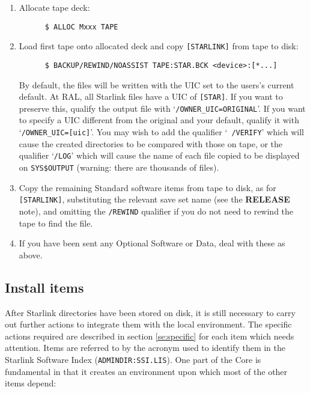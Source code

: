 \begin{enumerate}

\item Allocate tape deck:

\begin{verbatim}
      $ ALLOC Mxxx TAPE
\end{verbatim}

\item Load first tape onto allocated deck and copy {\tt [STARLINK]} from tape
to disk:

\begin{verbatim}
      $ BACKUP/REWIND/NOASSIST TAPE:STAR.BCK <device>:[*...]
\end{verbatim}

By default, the files will be written with the UIC set to the users's current
default. At RAL, all Starlink files have a UIC of {\tt [STAR]}. If you want to
preserve this, qualify the output file with `{\tt /OWNER\_UIC=ORIGINAL}'. If
you want to specify a UIC different from the original and your default, qualify
it with `{\tt /OWNER\_UIC=[uic]}'. You may wish to add the qualifier `{\tt
/VERIFY}' which will cause the created directories to be compared with those on
tape, or the qualifier `{\tt/LOG}' which will cause the name of each file
copied to be displayed on {\tt SYS\$OUTPUT} (warning: there are thousands of
files).

\item Copy the remaining Standard software items from tape to disk, as for {\tt
[STARLINK]}, substituting the relevant save set name (see the {\bf RELEASE}
note), and omitting the {\tt /REWIND} qualifier if you do not need to rewind
the tape to find the file.

\item If you have been sent any Optional Software or Data, deal with these as
above.

\end{enumerate}

\subsection {Install items}
\label{ss:install}

After Starlink directories have been stored on disk, it is still necessary to
carry out further actions to integrate them with the local environment. The
specific actions required are described in section \ref{se:specific} for each
item which needs attention. Items are referred to by the acronym used to
identify them in the Starlink Software Index ({\tt ADMINDIR:SSI.LIS}). One part
of the Core is fundamental in that it creates an environment upon which most
of the other items depend:

